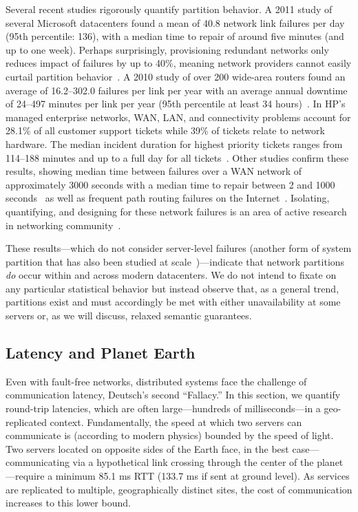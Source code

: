 Several recent studies rigorously quantify partition behavior. A 2011
study of several Microsoft datacenters found a mean of 40.8 network
link failures per day (95th percentile: 136), with a median time to
repair of around five minutes (and up to one week). Perhaps
surprisingly, provisioning redundant networks only reduces impact of
failures by up to 40\%, meaning network providers cannot easily
curtail partition behavior~\cite{sigcomm-dc}. A 2010 study of over 200
wide-area routers found an average of 16.2--302.0 failures per link
per year with an average annual downtime of 24--497 minutes per link
per year (95th percentile at least 34 hours)~\cite{sigcomm-wan}. In
HP's managed enterprise networks, WAN, LAN, and connectivity problems
account for 28.1\% of all customer support tickets while 39\% of
tickets relate to network hardware.  The median incident duration for
highest priority tickets ranges from 114--188 minutes and up to a full
day for all tickets~\cite{turner2012failure}. Other studies confirm
these results, showing median time between failures over a WAN network
of approximately 3000 seconds with a median time to repair between 2
and 1000 seconds~\cite{ip-backbone-failures} as well as frequent path
routing failures on the Internet~\cite{labovitz-failures}. Isolating,
quantifying, and designing for these network failures is an area of
active research in networking
community~\cite{surviving-failures-bodik, uw-failure-networks}.

These results---which do not consider server-level failures (another
form of system partition that has also been studied at
scale~\cite{google-availability})---indicate that network partitions
\textit{do} occur within and across modern datacenters. We do not
intend to fixate on any particular statistical behavior but instead
observe that, as a general trend, partitions exist and must
accordingly be met with either unavailability at some servers or, as
we will discuss, relaxed semantic guarantees.

\subsection{Latency and Planet Earth}

Even with fault-free networks, distributed systems face the challenge
of communication latency, Deutsch's second ``Fallacy.'' In this
section, we quantify round-trip latencies, which are often
large---hundreds of milliseconds---in a geo-replicated context.
Fundamentally, the speed at which two servers can communicate is
(according to modern physics) bounded by the speed of light. Two
servers located on opposite sides of the Earth face, in the best
case---communicating via a hypothetical link crossing through the
center of the planet---require a minimum 85.1 ms RTT (133.7 ms if sent
at ground level). As services are replicated to multiple,
geographically distinct sites, the cost of communication increases to
this lower bound.



